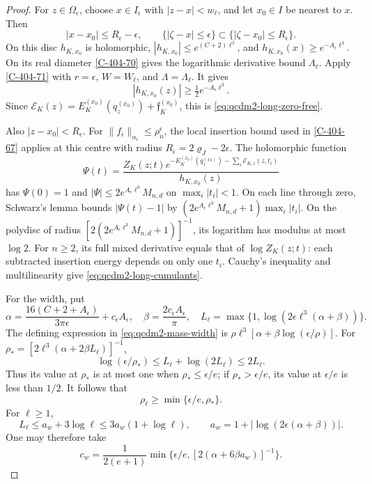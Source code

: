 \documentclass[11pt,letterpaper,reqno]{amsart}
\theoremstyle{definition}
\theoremstyle{remark}
\begin{document}
\begin{proof}
For \(z\in\Omega_\epsilon\), choose \(x\in I_\epsilon\)
with \(|z-x|<w_\ell\), and let \(x_0\in I\) be nearest to
\(x\). Then
\[
 |x-x_0|\le R_\epsilon-\epsilon,\qquad
 \{|\zeta-x|\le\epsilon\}\subset
                        \{|\zeta-x_0|\le R_\epsilon\}.
\]
On this disc \(h_{K,x_0}\) is holomorphic,
\(|h_{K,x_0}|\le e^{(C+2)\ell^3}\), and
\(h_{K,x_0}(x)\ge e^{-A_\epsilon\ell^3}\).
On its real diameter \cref{C-404-70} gives the logarithmic
derivative bound \(\Lambda_\ell\).
Apply \cref{C-404-71} with \(r=\epsilon\),
\(W=W_\ell\), and \(\Lambda=\Lambda_\ell\). It gives
\[
 |h_{K,x_0}(z)|\ge\tfrac12e^{-A_\epsilon\ell^3}.
\]
Since
\(\mathcal E_K(z)=E_K^{(x_0)}(q_z^{(x_0)})
                       +\mathfrak f_K^{(x_0)}\),
this is \eqref{eq:qcdm2-long-zero-free}.

Also \(|z-x_0|<R_\epsilon\). For
\(\|f_i\|_{\alpha_i}\le\rho_n^\epsilon\), the local insertion
bound used in \cref{C-404-67} applies at this centre with
radius \(R_\epsilon=2\varrho_J-2\epsilon\).
The holomorphic function
\[
 \Psi(t)=
 \frac{Z_K(z;t)
       e^{-E_K^{(x_0)}(q_z^{(x_0)})
              -\sum_i\mathcal E_{K,i}(z,t_i)}}
      {h_{K,x_0}(z)}
\]
has \(\Psi(0)=1\) and
\(|\Psi|\le2e^{A_\epsilon\ell^3}M_{n,d}\) on
\(\max_i|t_i|<1\).
On each line through zero, Schwarz's lemma bounds
\(|\Psi(t)-1|\) by
\((2e^{A_\epsilon\ell^3}M_{n,d}+1)\max_i|t_i|\).
On the polydisc of radius
\([2(2e^{A_\epsilon\ell^3}M_{n,d}+1)]^{-1}\),
its logarithm has modulus at most \(\log2\).
For \(n\ge2\), its full mixed derivative equals that of
\(\log Z_K(z;t)\): each subtracted insertion energy depends
on only one \(t_i\). Cauchy's inequality and multilinearity
give \eqref{eq:qcdm2-long-cumulants}.

For the width, put
\[
 \alpha=\frac{16(C+2+A_\epsilon)}{3\pi\epsilon}
                         +c_\epsilon A_\epsilon,\quad
 \beta=\frac{2c_\epsilon A_\epsilon}{\pi},\quad
 L_\ell=\max\{1,\log(2\epsilon\ell^3(\alpha+\beta))\}.
\]
The defining expression in \eqref{eq:qcdm2-mass-width} is
\(\rho\ell^3[\alpha+\beta\log(\epsilon/\rho)]\).
For
\(\rho_*=[2\ell^3(\alpha+2\beta L_\ell)]^{-1}\),
\[
 \log(\epsilon/\rho_*)\le
 L_\ell+\log(2L_\ell)\le2L_\ell.
\]
Thus its value at \(\rho_*\) is at most one when
\(\rho_*\le\epsilon/e\); if \(\rho_*>\epsilon/e\),
its value at \(\epsilon/e\) is less than \(1/2\).
It follows that
\[
 \rho_\ell\ge\min\{\epsilon/e,\rho_*\}.
\]
For \(\ell\ge1\),
\[
 L_\ell\le a_w+3\log\ell
       \le3a_w(1+\log\ell),\qquad
 a_w=1+|\log(2\epsilon(\alpha+\beta))|.
\]
One may therefore take
\[
 c_w=\frac1{2(e+1)}
       \min\{\epsilon/e,[2(\alpha+6\beta a_w)]^{-1}\}.
\]
\end{proof}
\end{document}
